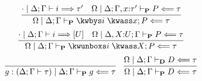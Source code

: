 %
\[
  \infer{%
    \prfchkjudg{\Omega \mid \goalctx{}}{\kwbys i\;\kwass x; P}{\tau}
  }{%
    \belsynjudg{\cdot \mid \goalctx{}}{i}{\tau^\prime}
    &
    \prfchkjudg{\Omega \mid \Delta; \Gamma, x{:}\tau^\prime}{P}{\tau}
  }
\]
\[
  \infer{%
    \prfchkjudg{\Omega \mid\goalctx{}}{\kwunboxs i\;\kwass X; P}{\tau}
  }{%
    \belsynjudg{\cdot \mid \goalctx{}}{i}{[U]}
    &
    \prfchkjudg{\Omega \mid \Delta, X{:}U; \Gamma}{P}{\tau}
  }
\]
%
\[
  \infer{%
    \prfchkjudg{g : \goal{} \mid \goalctx{}}{g}{\tau}
  }{%
  }
  \quad
  \infer{%
    \prfchkjudg{\Omega \mid\goalctx{}}{D}{\tau}
  }{%
    \dirchkjudg{\Omega \mid\goalctx{}}{D}{\tau}
  }
\]

